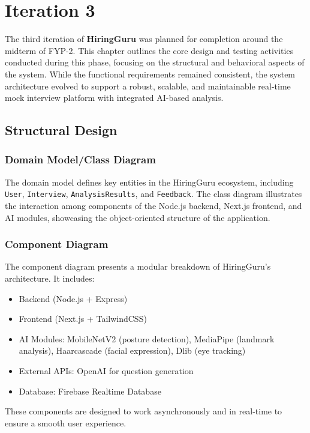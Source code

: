 \chapter{Iteration 3}
\label{ch:iter3}

The third iteration of \textbf{HiringGuru} was planned for completion around the midterm of FYP-2. This chapter outlines the core design and testing activities conducted during this phase, focusing on the structural and behavioral aspects of the system. While the functional requirements remained consistent, the system architecture evolved to support a robust, scalable, and maintainable real-time mock interview platform with integrated AI-based analysis.

\section{Structural Design}

\subsection{Domain Model/Class Diagram}
The domain model defines key entities in the HiringGuru ecosystem, including \texttt{User}, \texttt{Interview}, \texttt{AnalysisResults}, and \texttt{Feedback}. The class diagram illustrates the interaction among components of the Node.js backend, Next.js frontend, and AI modules, showcasing the object-oriented structure of the application.

\subsection{Component Diagram}
The component diagram presents a modular breakdown of HiringGuru’s architecture. It includes:
\begin{itemize}
  \item Backend (Node.js + Express)
  \item Frontend (Next.js + TailwindCSS)
  \item AI Modules: MobileNetV2 (posture detection), MediaPipe (landmark analysis), Haarcascade (facial expression), Dlib (eye tracking)
  \item External APIs: OpenAI for question generation
  \item Database: Firebase Realtime Database
\end{itemize}
These components are designed to work asynchronously and in real-time to ensure a smooth user experience.

